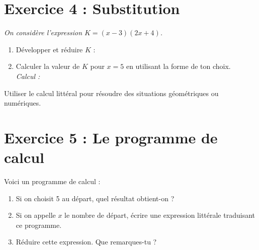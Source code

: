 \documentclass[11pt,a4paper]{article}
\begin{document}
\section*{Exercice 4 : Substitution}
\textit{On considère l'expression $K = (x - 3)(2x + 4)$.}
\begin{enumerate}
    \item Développer et réduire $K$ : \dotfill
    \item Calculer la valeur de $K$ pour $x = 5$ en utilisant la forme de ton choix. \\
    \textit{Calcul :} \dotfill
\end{enumerate}

\newpage

\begin{tcolorbox}[colback=blue!5!white,colframe=blue!75!black,title=Objectifs du Verso]
Utiliser le calcul littéral pour résoudre des situations géométriques ou numériques.
\end{tcolorbox}

\section*{Exercice 5 : Le programme de calcul}
Voici un programme de calcul :
\begin{center}
\end{center}

\begin{enumerate}
    \item Si on choisit 5 au départ, quel résultat obtient-on ? \dotfill
    \item Si on appelle $x$ le nombre de départ, écrire une expression littérale traduisant ce programme. \\
    \dotfill
    \item Réduire cette expression. Que remarques-tu ? \\
    \dotfill
\end{enumerate}
\end{document}
